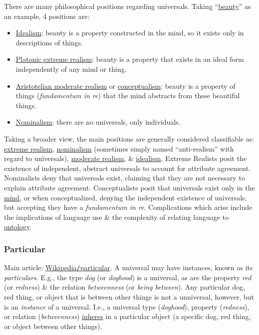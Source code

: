 \documentclass{article}
\begin{document}
There are many philosophical positions regarding universals. Taking ``\href{https://en.wikipedia.org/wiki/Beauty}{beauty}'' as an example, 4 positions are:
\begin{itemize}
	\item \href{https://en.wikipedia.org/wiki/Idealism}{Idealism}: beauty is a property constructed in the mind, so it exists only in descriptions of things.
	\item \href{https://en.wikipedia.org/wiki/Platonic_realism}{Platonic extreme realism}: beauty is a property that exists in an ideal form independently of any mind or thing.
	\item \href{https://en.wikipedia.org/wiki/Aristotle%27s_theory_of_universals}{Aristotelian moderate realism} or \href{https://en.wikipedia.org/wiki/Conceptualism}{conceptualism}: beauty is a property of things ({\it fundamentum in re}) that the mind abstracts from these beautiful things.
	\item \href{https://en.wikipedia.org/wiki/Nominalism}{Nominalism}: there are no universals, only individuals.
\end{itemize}
Taking a broader view, the main positions are generally considered classifiable as: \href{https://en.wikipedia.org/wiki/Philosophical_realism}{extreme realism}, \href{https://en.wikipedia.org/wiki/Nominalism}{nominalism} (sometimes simply named ``anti-realism'' with regard to universals), \href{https://en.wikipedia.org/wiki/Moderate_realism}{moderate realism}, \& \href{https://en.wikipedia.org/wiki/Idealism}{idealism}. Extreme Realists posit the existence of independent, abstract universals to account for attribute agreement. Nominalists deny that universals exist, claiming that they are not necessary to explain attribute agreement. Conceptualists posit that universals exist only in the \href{https://en.wikipedia.org/wiki/Philosophy_of_mind}{mind}, or when conceptualized, denying the independent existence of universals, but accepting they have a {\it fundamentum in re}. Complications which arise include the implications of language use \& the complexity of relating language to \href{https://en.wikipedia.org/wiki/Ontology}{ontology}.

\subsubsection{Particular}
Main article: \href{https://en.wikipedia.org/wiki/Particular}{Wikipedia{\tt/}particular}. A universal may have instances, known as its {\it particulars}. E.g., the type {\it dog} (or {\it doghood}) is a universal, as are the property {\it red} (or {\it redness}) \& the relation {\it betweenness} (or {\it being between}). Any particular dog, red thing, or object that is between other things is not a unniversal, however, but is an {\it instance} of a universal. I.e., a universal type ({\it doghood}), property ({\it redness}), or relation ({\it betweenness}) \href{https://en.wikipedia.org/wiki/Substance_theory#Inherence}{inheres} in a particular object (a specific dog, red thing, or object between other things).
\end{document}
